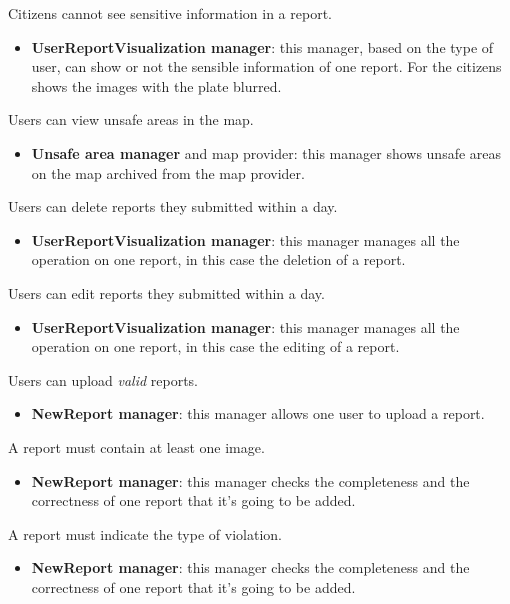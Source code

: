 \documentclass[../RASD.tex]{subfiles}
\begin{document}
\begin{enumerate}
         Citizens cannot see sensitive information in a report.
        \begin{itemize}
            \item \textbf{UserReportVisualization manager}: this manager, based on the type of user, can show or not the sensible information of one report.
            For the citizens shows the images with the plate blurred.
        \end{itemize}

         Users can view unsafe areas in the map.
        \begin{itemize}
            \item \textbf{Unsafe area manager} and map provider: this manager shows unsafe areas on the map archived from the map provider.
        \end{itemize}

         Users can delete reports they submitted within a day.
        \begin{itemize}
            \item \textbf{UserReportVisualization manager}: this manager manages all the operation on one report, in this case the deletion of a report.
        \end{itemize}

         Users can edit reports they submitted within a day.
        \begin{itemize}
            \item \textbf{UserReportVisualization manager}: this manager manages all the operation on one report, in this case the editing of a report.
        \end{itemize}

         Users can upload \textit{valid} reports.
        \begin{itemize}
            \item \textbf{NewReport manager}: this manager allows one user to upload a report.
        \end{itemize}

         A report must contain at least one image.
        \begin{itemize}
            \item \textbf{NewReport manager}: this manager checks the completeness and the correctness of one report that it’s going to be added.
        \end{itemize}

         A report must indicate the type of violation.
        \begin{itemize}
            \item \textbf{NewReport manager}: this manager checks the completeness and the correctness of one report that it’s going to be added.
        \end{itemize}


\end{enumerate}
\end{document}

